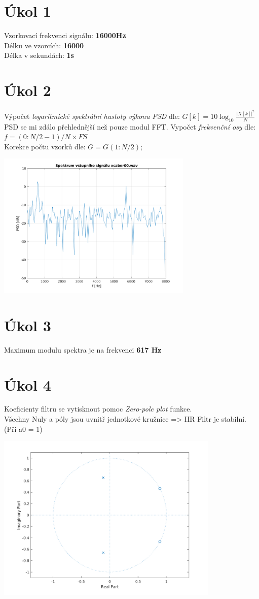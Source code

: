 \documentclass[a4paper, titlepage, final, 10pt]{article}
\title{\titleA}
\author{\authorA}
\begin{document}
\section{Úkol 1}
	Vzorkovací frekvenci signálu: \textbf{16000Hz} \\
	Délku ve vzorcích: \textbf{16000} \\
	Délka v sekundách: \textbf{1s}
\section{Úkol 2}
	Výpočet \textit{logaritmické spektrální hustoty výkonu PSD} dle: \( G[k] = 10 \log_{10} \frac{|X[k]|^2}{N} \) \\
	PSD se mi zdálo přehlednější než pouze modul FFT.
	Vypočet \textit{frekvenční osy} dle: \( f = (0:N/2-1)/N \times FS \) \\
	Korekce počtu vzorků dle: \( G = G(1:N/2); \)

	{\centering \includegraphics[width=\textwidth, height=7cm]{Final/task2.png} \par}
\section{Úkol 3}
	Maximum modulu spektra je na frekvenci \textbf{617 Hz}
\section{Úkol 4}
	Koeficienty filtru se vytisknout pomoc \textit{Zero-pole plot} funkce. \\
	Všechny Nuly a póly jsou uvnitř jednotkové kružnice => IIR Filtr je stabilní. (Při a0 = 1)

	{\centering \includegraphics[width=\textwidth, height=8cm, keepaspectratio]{Final/task4.png} \par}
\end{document}
